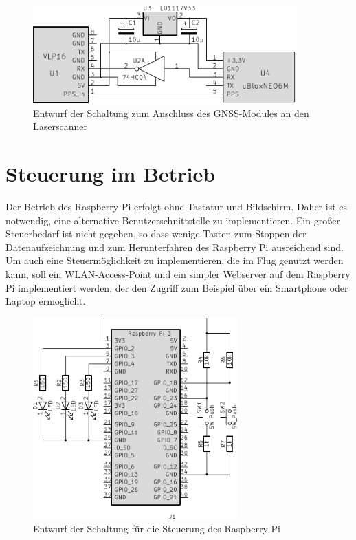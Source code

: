 \documentclass[a4paper,12pt,bibliography=totoc, listof=totoc,titlepage,pointlessnumbers]{scrreprt}
\begin{document}
\begin{figure}
 \centering
 \includegraphics[width=0.9\textwidth]{img/schaltplanGnss.pdf}
 \caption{Entwurf der Schaltung zum Anschluss des GNSS-Modules an den Laser\-scan\-ner}
 \label{abb:schaltplan}
\end{figure}

\section{Steuerung im Betrieb}
\label{s:steuermodul}
Der Betrieb des Rasp\-berry Pi erfolgt ohne Tastatur und Bildschirm. Daher ist es notwendig, eine alternative Benutzerschnittstelle zu implementieren. Ein großer Steuerbedarf ist nicht gegeben, so dass wenige Tasten zum Stoppen der Datenaufzeichnung und zum Herunterfahren des Rasp\-berry Pi ausreichend sind. Um auch eine Steuermöglichkeit zu implementieren, die im Flug genutzt werden kann, soll ein WLAN-Access-Point und ein simpler Webserver auf dem Rasp\-berry Pi implementiert werden, der den Zugriff zum Beispiel über ein Smartphone oder Laptop ermöglicht.

\begin{figure}
 \centering
 \includegraphics[width=0.7\textwidth]{img/schaltplanRasp.pdf}
 \caption{Entwurf der Schaltung für die Steuerung des Rasp\-berry Pi}
 \label{abb:steuerung}
\end{figure}
\end{document}
